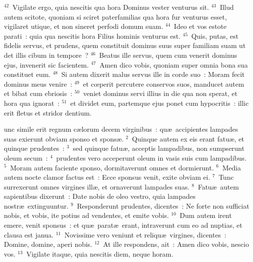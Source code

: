 ${}^{42}$~Vigilate ergo, quia nescitis qua hora Dominus vester venturus sit.
${}^{43}$~Illud autem scitote, quoniam si sciret paterfamilias qua hora fur venturus esset, vigilaret utique, et non sineret perfodi domum suam.
${}^{44}$~Ideo et vos estote parati~: quia qua nescitis hora Filius hominis venturus est.
${}^{45}$~Quis, putas, est fidelis servus, et prudens, quem constituit dominus suus super familiam suam ut det illis cibum in tempore~?
${}^{46}$~Beatus ille servus, quem cum venerit dominus ejus, invenerit sic facientem.
${}^{47}$~Amen dico vobis, quoniam super omnia bona sua constituet eum.
${}^{48}$~Si autem dixerit malus servus ille in corde suo~: Moram fecit dominus meus venire~:
${}^{49}$~et cœperit percutere conservos suos, manducet autem et bibat cum ebriosis~:
${}^{50}$~veniet dominus servi illius in die qua non sperat, et hora qua ignorat~:
${}^{51}$~et dividet eum, partemque ejus ponet cum hypocritis~: illic erit fletus et stridor dentium.

\bchapter
{}unc simile erit regnum c\ae lorum decem virginibus~: qu\ae\ accipientes lampades suas exierunt obviam sponso et spons\ae .
${}^{2}$~Quinque autem ex eis erant fatu\ae , et quinque prudentes~:
${}^{3}$~sed quinque fatu\ae , acceptis lampadibus, non sumpserunt oleum secum~:
${}^{4}$~prudentes vero acceperunt oleum in vasis suis cum lampadibus.
${}^{5}$~Moram autem faciente sponso, dormitaverunt omnes et dormierunt.
${}^{6}$~Media autem nocte clamor factus est~: Ecce sponsus venit, exite obviam ei.
${}^{7}$~Tunc surrexerunt omnes virgines ill\ae , et ornaverunt lampades suas.
${}^{8}$~Fatu\ae\ autem sapientibus dixerunt~: Date nobis de oleo vestro, quia lampades nostr\ae\ extinguuntur.
${}^{9}$~Responderunt prudentes, dicentes~: Ne forte non sufficiat nobis, et vobis, ite potius ad vendentes, et emite vobis.
${}^{10}$~Dum autem irent emere, venit sponsus~: et qu\ae\ parat\ae\ erant, intraverunt cum eo ad nuptias, et clausa est janua.
${}^{11}$~Novissime vero veniunt et reliqu\ae\ virgines, dicentes~: Domine, domine, aperi nobis.
${}^{12}$~At ille respondens, ait~: Amen dico vobis, nescio vos.
${}^{13}$~Vigilate itaque, quia nescitis diem, neque horam.


